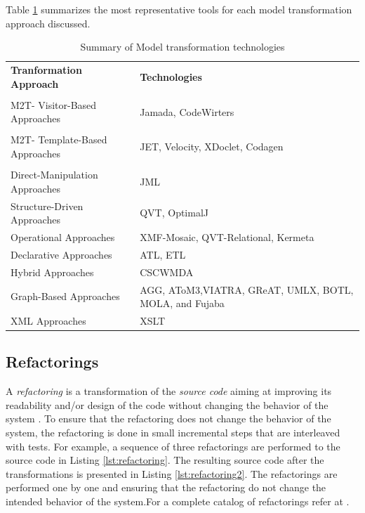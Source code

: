 Table \ref{table:toolSummary} summarizes the most representative tools for each model transformation approach discussed.

\begin{table}[h]
\caption{Summary of Model transformation technologies}
\label{table:toolSummary}
\begin{tabularx}{\textwidth}{X|X}
\toprule
\rowcolor[HTML]{BBDAFF}
\textbf{Tranformation Approach} & \textbf{Technologies}     \\  \\ \hline
M2T- Visitor-Based Approaches & Jamada, CodeWirters  \\  \\ \hline
M2T- Template-Based Approaches  & JET, Velocity, XDoclet, Codagen  \\ \\ \hline
\hline
Direct-Manipulation Approaches & JML   \\ \hline
Structure-Driven Approaches & QVT, OptimalJ   \\ \hline
Operational Approaches & XMF-Mosaic, QVT-Relational, Kermeta  \\ \hline
Declarative Approaches & ATL, ETL    \\ \hline
Hybrid Approaches & CSCWMDA   \\ \hline
Graph-Based Approaches & AGG, AToM3,VIATRA, GReAT, UMLX, BOTL, MOLA, and Fujaba  \\ \hline
XML Approaches & XSLT   \\ \hline
\end{tabularx}
\end{table}

\subsection{Refactorings}

A \textit{refactoring} is a transformation of the \textit{source code} aiming at improving its readability and/or design of the code without changing the behavior of the system \cite{Fowler2000}. To ensure that the refactoring does not change the behavior of the system, the refactoring is done in small incremental steps that are interleaved with tests. 
For example, a sequence of three refactorings are performed to the source code in Listing \ref{lst:refactoring}.
The resulting source code after the transformations is presented in Listing  \ref{lst:refactoring2}. The refactorings are performed one by one and ensuring that the refactoring do not change the intended behavior of the system.For a complete catalog of  refactorings refer at \cite{Fowler2000}. 

